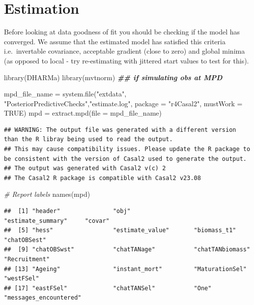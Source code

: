 \documentclass[
]{book}
\newenvironment{Shaded}{\begin{snugshade}}{\end{snugshade}}
\newcommand{\AttributeTok}[1]{\textcolor[rgb]{0.77,0.63,0.00}{#1}}
\newcommand{\CommentTok}[1]{\textcolor[rgb]{0.56,0.35,0.01}{\textit{#1}}}
\newcommand{\ConstantTok}[1]{\textcolor[rgb]{0.00,0.00,0.00}{#1}}
\newcommand{\DocumentationTok}[1]{\textcolor[rgb]{0.56,0.35,0.01}{\textbf{\textit{#1}}}}
\newcommand{\FunctionTok}[1]{\textcolor[rgb]{0.00,0.00,0.00}{#1}}
\newcommand{\NormalTok}[1]{#1}
\newcommand{\OtherTok}[1]{\textcolor[rgb]{0.56,0.35,0.01}{#1}}
\newcommand{\StringTok}[1]{\textcolor[rgb]{0.31,0.60,0.02}{#1}}
\begin{document}
\hypertarget{estimation}{%
\section{Estimation}\label{estimation}}

Before looking at data goodness of fit you should be checking if the model has converged. We assume that the estimated model has satisfied this criteria i.e.~invertable covariance, acceptable gradient (close to zero) and global minima (as opposed to local - try re-estimating with jittered start values to test for this).

\begin{Shaded}
\begin{Highlighting}[]
\FunctionTok{library}\NormalTok{(DHARMa)}
\FunctionTok{library}\NormalTok{(mvtnorm) }\DocumentationTok{\#\# if simulating obs at MPD}

\NormalTok{mpd\_file\_name }\OtherTok{=} \FunctionTok{system.file}\NormalTok{(}\StringTok{"extdata"}\NormalTok{, }\StringTok{"PosteriorPredictiveChecks"}\NormalTok{,}\StringTok{"estimate.log"}\NormalTok{, }
                            \AttributeTok{package =} \StringTok{"r4Casal2"}\NormalTok{, }\AttributeTok{mustWork =} \ConstantTok{TRUE}\NormalTok{)}
\NormalTok{mpd }\OtherTok{=} \FunctionTok{extract.mpd}\NormalTok{(}\AttributeTok{file =}\NormalTok{ mpd\_file\_name)}
\end{Highlighting}
\end{Shaded}

\begin{verbatim}
## WARNING: The output file was generated with a different version than the R libray being used to read the output.
## This may cause compatibility issues. Please update the R package to be consistent with the version of Casal2 used to generate the output.
## The output was generated with Casal2 v(c) 2
## The Casal2 R package is compatible with Casal2 v23.08
\end{verbatim}

\begin{Shaded}
\begin{Highlighting}[]
\CommentTok{\# Report labels}
\FunctionTok{names}\NormalTok{(mpd)}
\end{Highlighting}
\end{Shaded}

\begin{verbatim}
##  [1] "header"               "obj"                  "estimate_summary"     "covar"               
##  [5] "hess"                 "estimate_value"       "biomass_t1"           "chatOBSest"          
##  [9] "chatOBSwst"           "chatTANage"           "chatTANbiomass"       "Recruitment"         
## [13] "Ageing"               "instant_mort"         "MaturationSel"        "westFSel"            
## [17] "eastFSel"             "chatTANSel"           "One"                  "messages_encountered"
\end{verbatim}
\end{document}
